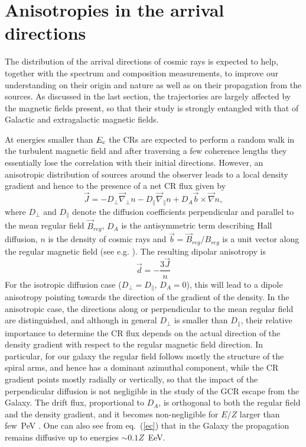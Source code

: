 \documentclass[twoside,12pt]{article}
\begin{document}
\bigskip 
\section{Anisotropies in the arrival directions}

The distribution of the arrival directions of cosmic rays is expected to help, together with the spectrum and composition measurements, to improve our  understanding on their origin and  nature as well as on their propagation from the sources. As discussed in the last section, the trajectories are largely affected by the magnetic fields present, so that their study is strongly entangled with that of Galactic and extragalactic magnetic fields. 

At energies smaller than $E_{\rm c}$ the CRs are expected to perform a random walk in the turbulent magnetic field and after traversing a few coherence lengths they essentially lose the correlation with their initial directions. 
However, an anisotropic distribution of sources around the observer leads to a local density gradient and hence to the presence of a net CR flux given by
\begin{equation}
{\vec J} = - D_\perp {\vec \nabla_\perp} n - D_\parallel {\vec \nabla_\parallel} n + D_A {\vec b} \times {\vec \nabla} n, \label{difflux}
\end{equation}
where $D_\perp$ and $D_\parallel$ denote the diffusion coefficients perpendicular and parallel to the mean regular field ${\vec B}_{reg}$, $D_A$ is the antisymmetric
term describing Hall diffusion, $n$ is the density of cosmic rays and ${\vec b}={\vec B}_{reg}/B_{reg}$ is a unit vector along the regular magnetic field  (see e.g. \cite{ca03}). The resulting dipolar anisotropy is 
\begin{equation}
{\vec d}=-\frac{3{\vec J}}{n}
\end{equation}
For the isotropic diffusion case ($D_\perp = D_\parallel$, $D_A=0$), this will lead to a dipole anisotropy pointing towards the direction of the gradient of the density. In the anisotropic case, the directions along or perpendicular to the mean regular field are distinguished, and although in general $D_\perp$ is smaller than $D_\parallel$, their relative importance to determine the CR flux depends on the actual direction of the density gradient with respect to the regular magnetic field direction. In particular, for our galaxy the regular field follows mostly the structure of the spiral arms, and hence has a dominant azimuthal component, while the CR gradient points mostly radially or vertically, so that the impact of the perpendicular diffusion is not negligible in the study of the GCR escape from the Galaxy. The drift flux, proportional to $D_A$, is orthogonal to both the regular field and the density gradient, and it becomes non-negligible for $E/Z$ larger than few~PeV \cite{ca04}.  One can also see from eq.~(\ref{ec}) that  in the Galaxy the propagation remains diffusive up to energies $\sim 0.1Z$~EeV.
\end{document}
